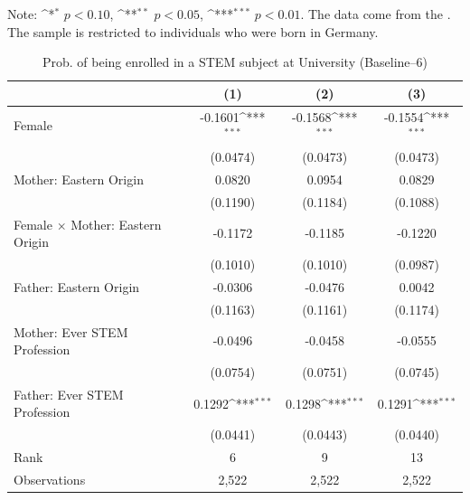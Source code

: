 \documentclass[a4paper, oneside, hyperfootnotes = false]{article}
\def\sym#1{\ifmmode^{#1}\else\(^{#1}\)\fi}
\begin{document}
{\begin{table}[ht]
\begin{center}
		\vspace{2mm}
		
		\parbox{10cm}{
			\linespread{1}\footnotesize Note: \sym{*} \(p<0.10\), \sym{**} \(p<0.05\), \sym{***} \(p<0.01\). The data come from the \cite{SOEP2023}. The sample is restricted to individuals who were born in Germany.}
		
	\end{center}
\end{table}

\begin{table}[ht]
	\caption[STEM subject at University (Baseline--6)]{Prob. of being enrolled in a STEM subject at University (Baseline--6)}
	\label{tab:baseline--6}
	\begin{center}
		\begin{tabular}{l*{3}{c}}
			\toprule
			&\multicolumn{1}{c}{(1)}         &\multicolumn{1}{c}{(2)}         &\multicolumn{1}{c}{(3)}         \\
			\midrule
			Female              &     -0.1601\sym{***}&     -0.1568\sym{***}&     -0.1554\sym{***}\\
			&    (0.0474)         &    (0.0473)         &    (0.0473)         \\
			\addlinespace
			Mother: Eastern Origin&      0.0820         &      0.0954         &      0.0829         \\
			&    (0.1190)         &    (0.1184)         &    (0.1088)         \\
			\addlinespace
			Female $\times$ Mother: Eastern Origin&     -0.1172         &     -0.1185         &     -0.1220         \\
			&    (0.1010)         &    (0.1010)         &    (0.0987)         \\
			\addlinespace
			Father: Eastern Origin&     -0.0306         &     -0.0476         &      0.0042         \\
			&    (0.1163)         &    (0.1161)         &    (0.1174)         \\
			\addlinespace
			Mother: Ever STEM Profession&     -0.0496         &     -0.0458         &     -0.0555         \\
			&    (0.0754)         &    (0.0751)         &    (0.0745)         \\
			\addlinespace
			Father: Ever STEM Profession&      0.1292\sym{***}&      0.1298\sym{***}&      0.1291\sym{***}\\
			&    (0.0441)         &    (0.0443)         &    (0.0440)         \\
			\midrule
			Rank                &      6         &      9         &     13         \\
			Observations                   &   2,522         &   2,522         &   2,522         \\
			\bottomrule
		\end{tabular}
		

\end{center}
\end{table}}
\end{document}

